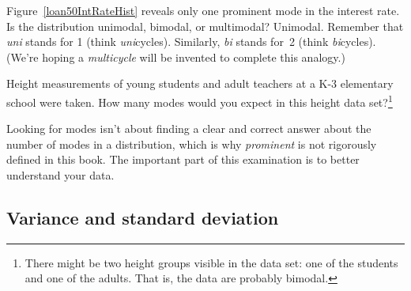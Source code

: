 \begin{example}{Figure~\ref{loan50IntRateHist}
    reveals only one prominent mode in the interest rate.
    Is the distribution unimodal, bimodal, or multimodal?}
  Unimodal.
  Remember that \emph{uni} stands for 1 (think \emph{uni}cycles).
  Similarly, \emph{bi} stands for~2 (think \emph{bi}cycles).
  (We're hoping a \emph{multicycle} will be invented to complete
  this analogy.)
\end{example}

%

\begin{exercise}
Height measurements of young students and adult teachers
at a K-3 elementary school were taken.
How many modes would you expect in this height data
set?\footnote{There might be two height groups visible
  in the data set: one of the students and one of the adults.
  That is, the data are probably bimodal.}
\end{exercise}

Looking for modes isn't about finding a clear and correct
answer about the number of modes in a distribution,
which is why \emph{prominent} is not
rigorously defined in this book.
The important part of this examination is to better
understand your data.



\subsection{Variance and standard deviation}
\label{variability}

